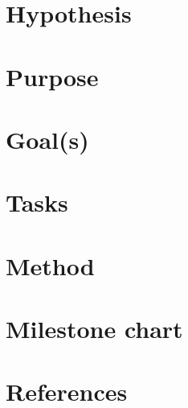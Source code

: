 \documentclass[paper=a4, fontsize=11pt]{scrartcl} %
\numberwithin{equation}{section} %
\numberwithin{figure}{section} %
\numberwithin{table}{section} %
\begin{document}
\section{Hypothesis}

\section{Purpose}

\section{Goal(s)}

\section{Tasks}

\section{Method}

\section{Milestone chart}

\section{References}
\end{document}
